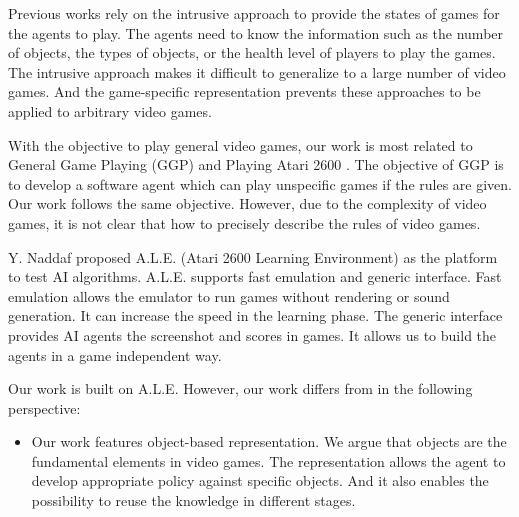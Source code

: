 Previous works rely on the intrusive approach to provide the states of games for the agents to play.
The agents need to know the information such as the number of objects, the types of objects,
or the health level of players to play the games. The intrusive approach makes it difficult to generalize
to a large number of video games. And the game-specific representation prevents these approaches
to be applied to arbitrary video games.

With the objective to play general video games, our work is most related to 
General Game Playing\cite{GGP} (GGP) and Playing Atari 2600 \cite{Yavar}. 
The objective of GGP is to develop a software agent which can play unspecific games if the rules
are given. Our work follows the same objective. However, due to the complexity of video games, 
it is not clear that how to precisely describe the rules of video games.

Y. Naddaf\cite{Yavar} proposed A.L.E. (Atari 2600 Learning Environment) as the platform to test AI algorithms.
A.L.E. supports fast emulation and generic interface. Fast emulation allows the emulator to run 
games without rendering or sound generation. It can increase the speed in the learning phase.
The generic interface provides AI agents the screenshot and scores in games. It allows us
to build the agents in a game independent way.

Our work is built on A.L.E. However, our work differs from \cite{Yavar} in the following perspective:

\begin{itemize}{}
\item Our work features object-based representation. We argue that objects are the fundamental elements
in video games. The representation allows the agent to develop appropriate policy against specific 
objects. And it also enables the possibility to reuse the knowledge in different stages.
\end{itemize}

